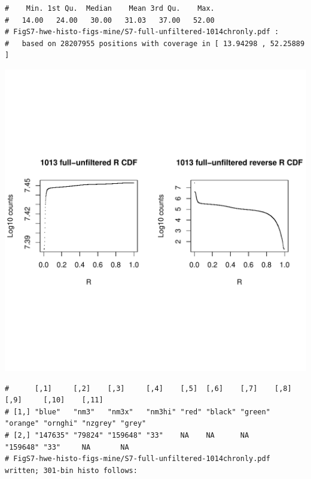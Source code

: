 \documentclass{article}\usepackage[]{graphicx}\usepackage[]{color}
\makeatletter
\def\maxwidth{ %
  \ifdim\Gin@nat@width>\linewidth
    \linewidth
  \else
    \Gin@nat@width
  \fi
}
\newenvironment{kframe}{%
 \def\at@end@of@kframe{}%
 \ifinner\ifhmode%
  \def\at@end@of@kframe{\end{minipage}}%
  \begin{minipage}{\columnwidth}%
 \fi\fi%
 \def\FrameCommand##1{\hskip\@totalleftmargin \hskip-\fboxsep
 \colorbox{shadecolor}{##1}\hskip-\fboxsep
     \hskip-\linewidth \hskip-\@totalleftmargin \hskip\columnwidth}%
 \MakeFramed {\advance\hsize-\width
   \@totalleftmargin\z@ \linewidth\hsize
   \@setminipage}}%
 {\par\unskip\endMakeFramed%
 \at@end@of@kframe}
\newenvironment{knitrout}{}{} %
\makeatother
\begin{document}
\begin{knitrout}
\begin{kframe}
\begin{verbatim}
#    Min. 1st Qu.  Median    Mean 3rd Qu.    Max. 
#   14.00   24.00   30.00   31.03   37.00   52.00 
# FigS7-hwe-histo-figs-mine/S7-full-unfiltered-1014chronly.pdf :
#   based on 28207955 positions with coverage in [ 13.94298 , 52.25889 ]
\end{verbatim}
\end{kframe}
\includegraphics[width=\maxwidth]{FigS7-hwe-histo-figs-knitr/unnamed-chunk-10-6} 
\begin{kframe}\begin{verbatim}
#      [,1]     [,2]    [,3]     [,4]    [,5]  [,6]    [,7]    [,8]     [,9]     [,10]    [,11] 
# [1,] "blue"   "nm3"   "nm3x"   "nm3hi" "red" "black" "green" "orange" "ornghi" "nzgrey" "grey"
# [2,] "147635" "79824" "159648" "33"    NA    NA      NA      "159648" "33"     NA       NA    
# FigS7-hwe-histo-figs-mine/S7-full-unfiltered-1014chronly.pdf written; 301-bin histo follows:
\end{verbatim}
\end{kframe}

\end{knitrout}
\end{document}
